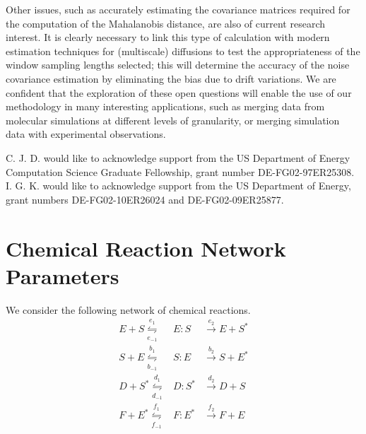 \documentclass[aip,jcp,preprint]{revtex4-1}
\begin{document}
%
%
Other issues, such as accurately estimating the covariance matrices required for the computation of the Mahalanobis distance, are also of current research interest.
%
It is clearly necessary to link this type of calculation with modern estimation techniques for (multiscale) diffusions \cite{ait2002maximum, ait2003effects, ait2008closed}
to test the appropriateness of the window sampling lengths selected; this will determine the accuracy of the noise covariance estimation by eliminating
the bias due to drift variations.
%
We are confident that the exploration of these open questions will enable the use of our methodology in many  interesting applications,
such as merging data from molecular simulations at different levels of granularity, or merging simulation data with experimental observations.

\begin{acknowledgments}
C. J. D. would like to acknowledge support from the US Department of Energy Computation Science Graduate Fellowship, grant number DE-FG02-97ER25308.
%
I. G. K. would like to acknowledge support from the US Department of Energy, grant numbers DE-FG02-10ER26024 and DE-FG02-09ER25877.
\end{acknowledgments}



\appendix

\section{Chemical Reaction Network Parameters} \label{app:rxn}

We consider the following network of chemical reactions.
\begin{equation}
\begin{array}{rcl}
E + S \overset{e_1}{\underset{e_{-1}}{\leftrightharpoons}} & E:S & \overset{e_2}{\rightarrow} E + S^{*} \\
S + E \overset{b_1}{\underset{b_{-1}}{\leftrightharpoons}} & S:E & \overset{b_2}{\rightarrow} S + E^{*}\\
D + S^{*} \overset{d_1}{\underset{d_{-1}}{\leftrightharpoons}} & D:S^{*} & \overset{d_2}{\rightarrow} D + S\\
F + E^{*} \overset{f_1}{\underset{f_{-1}}{\leftrightharpoons}} & F:E^{*} & \overset{f_2}{\rightarrow} F + E
\end{array}
\end{equation}
\end{document}
